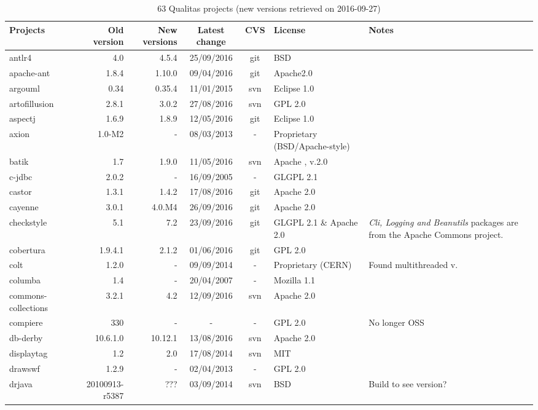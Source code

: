 \documentclass{sig-alternate-05-2015}
\begin{document}
\begin{table}
	\centering
	\caption{63 Qualitas projects (new versions retrieved on 2016-09-27)}
	\label{t:new_and_old}
	\small
		\begin{tabular}{l|r|r|c|c|p{3cm}|p{3cm}}
			\hline 
			Projects & Old version & New versions & Latest change & CVS & License & Notes \\
			\hline
			antlr4 & 4.0 & 4.5.4 & 25/09/2016 & git & BSD \\
			apache-ant & 1.8.4 & 1.10.0 & 09/04/2016 & git & Apache2.0 \\
			argouml & 0.34 & 0.35.4 & 11/01/2015 	& svn & Eclipse  1.0 \\
			artofillusion & 2.8.1 & 3.0.2 & 27/08/2016 & svn & GPL 2.0 \\
			aspectj & 1.6.9 & 1.8.9 & 12/05/2016 & git & Eclipse   1.0 \\
			axion & 1.0-M2 & - & 08/03/2013 & - & Proprietary (BSD/Apache-style) \\
			batik & 1.7 & 1.9.0 & 11/05/2016 & svn & Apache , v.2.0 \\
			c-jdbc & 2.0.2 & - & 16/09/2005 & - & GLGPL 2.1 \\
			castor & 1.3.1 & 1.4.2 & 17/08/2016 & git & Apache 2.0 \\
			cayenne & 3.0.1 & 4.0.M4 &  26/09/2016 & git & Apache 2.0 \\
			checkstyle & 5.1 & 7.2  & 23/09/2016 & git & GLGPL 2.1 \& Apache 2.0 & \textit{Cli, Logging and Beanutils} packages are from the Apache Commons project. \\
			cobertura & 1.9.4.1 & 2.1.2 & 01/06/2016 & git & GPL 2.0  \\
			colt & 1.2.0 & - & 09/09/2014 & - & Proprietary (CERN) & Found multithreaded v. \\
			columba & 1.4 & - & 20/04/2007 & - & Mozilla   1.1  \\
			commons-collections & 3.2.1 & 4.2 & 12/09/2016 & svn & Apache 2.0 \\
			compiere & 330 & - & - & - & GPL 2.0 & No longer OSS \\
			db-derby & 10.6.1.0 & 10.12.1 & 13/08/2016 & svn & Apache 2.0 \\
			displaytag & 1.2 & 2.0 & 17/08/2014 & svn & MIT  \\
			drawswf & 1.2.9 & - & 02/04/2013 & - & GPL 2.0 \\
			drjava & 20100913-r5387 & ??? & 03/09/2014 & svn & BSD  & Build to see version? \\

\end{tabular}
\end{table}
\end{document}
